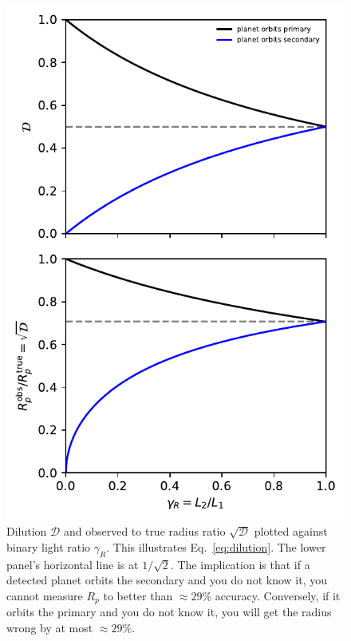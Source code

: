 \documentclass{emulateapj}
\begin{document}
\begin{figure}[!t]
	\begin{center}
		\includegraphics[scale=.9]{figures/observed_radii_vs_gammaR.pdf}
	\end{center}
	\caption{Dilution $\mathcal{D}$ and observed to true radius ratio 
	$\sqrt{\mathcal{D}}$ plotted against binary light ratio $\gamma_R$. This 
	illustrates	Eq.~\ref{eq:dilution}. The lower panel's horizontal line is at 
	$1/\sqrt{2}$.
	The implication is that if a detected planet orbits the secondary and you do 
	not know it, you cannot measure $R_p$ to better than $\approx 29\%$ 
	accuracy.
	Conversely, if it orbits the primary and you do not know it, you will get 
	the radius wrong by at most $\approx 29\%$.
	}
	\label{fig:rad_vs_gammaR}
\end{figure}
\end{document}
